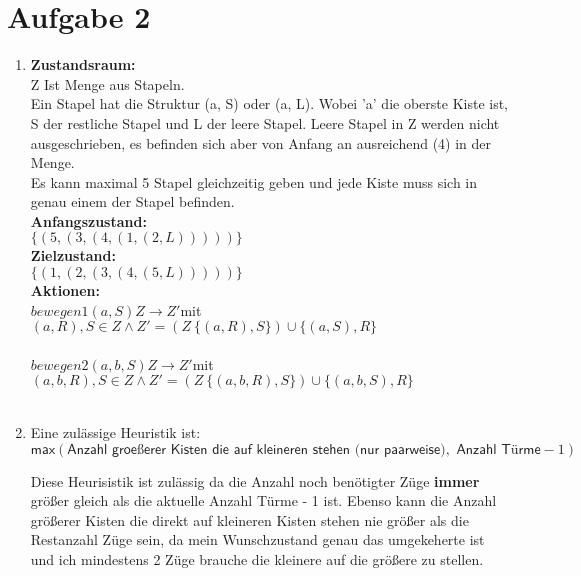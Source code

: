 \documentclass[a4paper,10pt]{article}
\begin{document}
\section*{Aufgabe 2}
\begin{enumerate}[~~a)]
    \item 
    \textbf{Zustandsraum:} \\
    Z Ist Menge aus Stapeln. \\
    Ein Stapel hat die Struktur (a, S) oder (a, L). Wobei 'a' die oberste Kiste ist, S der restliche Stapel und L der leere Stapel. Leere Stapel in Z werden nicht ausgeschrieben, es befinden sich aber von Anfang an ausreichend (4) in der Menge.\\
    Es kann maximal 5 Stapel gleichzeitig geben und jede Kiste muss sich in genau einem der Stapel befinden. \\
    \textbf{Anfangszustand:} \\
    $\{(5, (3, (4, (1, (2, L)))))\}$ \\
    \textbf{Zielzustand:} \\
    $\{(1, (2, (3, (4, (5, L)))))\}$ \\     
    \textbf{Aktionen:} \\
    $bewegen1(a, S)Z \rightarrow   Z'$mit\\
    $(a, R),S \in Z \land Z' = (Z \ \{(a, R), S\}) \cup \{(a, S), R\}$ \\ \\
    $bewegen2(a, b, S)Z \rightarrow   Z'$mit\\
    $(a, b, R),S \in Z \land Z' = (Z \ \{(a, b, R), S\}) \cup \{(a, b, S), R\}$ \\ \\
    \item Eine zulässige Heuristik ist: \\
        $$\textsf{max}(\textsf{Anzahl groeßerer Kisten die auf kleineren stehen (nur paarweise)}, \textsf{  Anzahl Türme} - 1)$$

          Diese Heurisistik ist zulässig da die Anzahl noch benötigter Züge \textbf{immer} größer gleich als die aktuelle Anzahl Türme - 1 ist. Ebenso kann die Anzahl größerer Kisten die direkt auf kleineren Kisten stehen nie größer als die Restanzahl Züge sein, da mein Wunschzustand genau das umgekeherte ist und ich mindestens 2 Züge brauche die kleinere auf die größere zu stellen. 
\end{enumerate}
\end{document}
